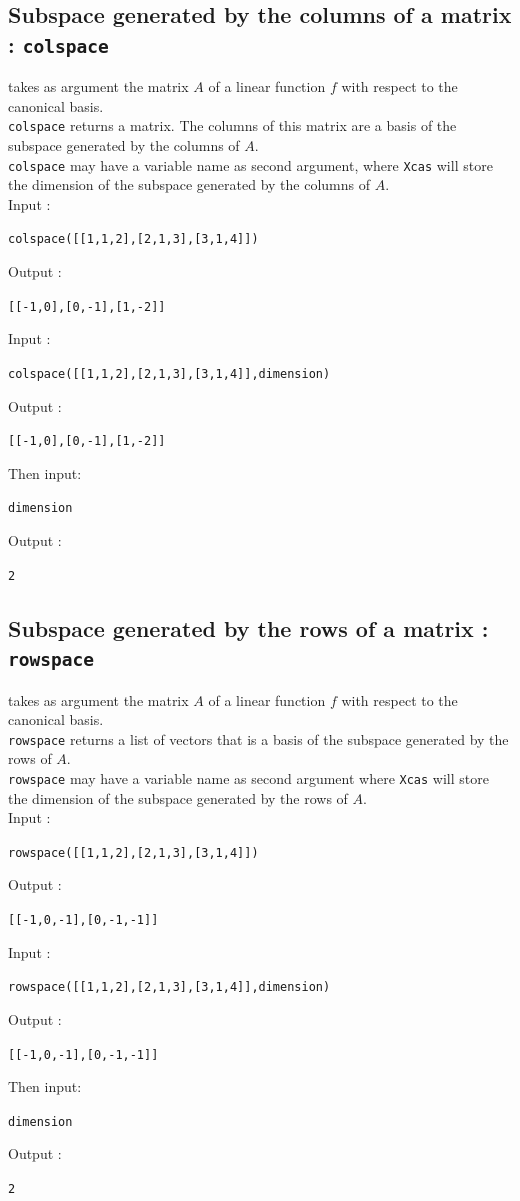 \documentclass[a4paper,11pt]{book}
\begin{document}
\subsection{Subspace generated by the columns of a matrix : {\tt colspace}}
 takes as argument the matrix $A$ of a linear 
function $f$ with respect to the canonical basis.\\
{\tt colspace} returns a matrix. The columns of this  matrix are a basis of the
subspace generated by the columns of $A$.\\
{\tt colspace} may have a variable name as second argument, where 
{\tt  Xcas}
will store the dimension of the subspace generated by the columns of $A$.\\
Input :
\begin{center}{\tt colspace([[1,1,2],[2,1,3],[3,1,4]])}\end{center}
Output :
\begin{center}{\tt  [[-1,0],[0,-1],[1,-2]]}\end{center}
Input :
\begin{center}{\tt colspace([[1,1,2],[2,1,3],[3,1,4]],dimension)}\end{center}
Output :
\begin{center}{\tt  [[-1,0],[0,-1],[1,-2]]}\end{center}
Then input:
\begin{center}{\tt dimension}\end{center}
Output :
\begin{center}{\tt  2}\end{center}

\subsection{Subspace generated by the rows of a matrix : {\tt rowspace}}
 takes as argument the matrix $A$ of a linear 
function $f$ with respect to the canonical basis.\\
{\tt rowspace} returns a list of vectors that is a basis of the 
subspace generated by the rows of $A$.\\
{\tt rowspace} may have a variable name as second argument where {\tt Xcas}
will store the dimension of the subspace generated by the rows of $A$.\\
Input :
\begin{center}{\tt rowspace([[1,1,2],[2,1,3],[3,1,4]])}\end{center}
Output :
\begin{center}{\tt  [[-1,0,-1],[0,-1,-1]]}\end{center}
Input :
\begin{center}{\tt rowspace([[1,1,2],[2,1,3],[3,1,4]],dimension)}\end{center}
Output :
\begin{center}{\tt  [[-1,0,-1],[0,-1,-1]]}\end{center}
Then input:
\begin{center}{\tt dimension}\end{center}
Output :
\begin{center}{\tt  2}\end{center}
\end{document}
